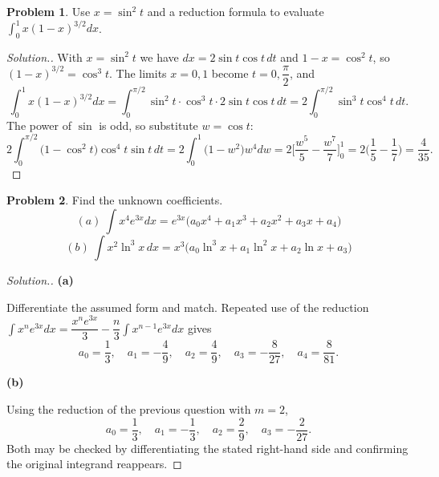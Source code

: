 \documentclass[11pt,a4paper]{article}
\theoremstyle{definition}
\newtheorem{problemx}{Problem}[subsection]
\newenvironment{problem}{\begin{problemx}}{\end{problemx}}
\newenvironment{solution}
  {\renewcommand{\qedsymbol}{}\begin{proof}[\textit{Solution}.]}
  {\end{proof}}
\newcommand{\subhead}[1]{%
  \par\medskip\noindent\textbf{#1}\par\nobreak\smallskip}
\begin{document}
\begin{problem}
Use $x = \sin^2t$ and a reduction formula to evaluate
$\displaystyle\int_0^1x(1-x)^{3/2}dx$.
\end{problem}
\begin{solution}
With $x = \sin^2 t$ we have $dx = 2\sin t\cos t\,dt$ and
$1-x = \cos^2t$, so $(1-x)^{3/2} = \cos^3t$. The limits $x=0,1$ become
$t = 0, \dfrac{\pi}{2}$, and
$$\int_0^1x(1-x)^{3/2}dx
= \int_0^{\pi/2}\sin^2t\cdot\cos^3t\cdot 2\sin t\cos t\,dt
= 2\int_0^{\pi/2}\sin^3t\cos^4t\,dt .$$
The power of $\sin$ is odd, so substitute $w = \cos t$:
$$2\int_0^{\pi/2}\big(1-\cos^2t\big)\cos^4t\sin t\,dt
= 2\int_0^1\big(1-w^2\big)w^4dw
= 2\Big[\frac{w^5}{5} - \frac{w^7}{7}\Big]_0^1
= 2\Big(\frac15-\frac17\Big) = \frac{4}{35}.$$
\end{solution}

\begin{problem}
Find the unknown coefficients.
$$(a)\ \int x^4e^{3x}dx = e^{3x}\big(a_0x^4 + a_1x^3 + a_2x^2 + a_3x + a_4\big)$$
$$(b)\ \int x^2\ln^3x\,dx = x^3\big(a_0\ln^3x + a_1\ln^2x + a_2\ln x + a_3\big)$$
\end{problem}
\begin{solution}
\subhead{(a)}
Differentiate the assumed form and match. Repeated use of the reduction
$\int x^ne^{3x}dx = \dfrac{x^ne^{3x}}{3} - \dfrac{n}{3}\int x^{n-1}e^{3x}dx$
gives
$$a_0 = \frac13,\quad a_1 = -\frac49,\quad a_2 = \frac49,
\quad a_3 = -\frac{8}{27},\quad a_4 = \frac{8}{81}.$$

\subhead{(b)}
Using the reduction of the previous question with $m=2$,
$$a_0 = \frac13,\quad a_1 = -\frac13,\quad a_2 = \frac29,
\quad a_3 = -\frac{2}{27}.$$
Both may be checked by differentiating the stated right-hand side and confirming
the original integrand reappears.
\end{solution}
\end{document}
